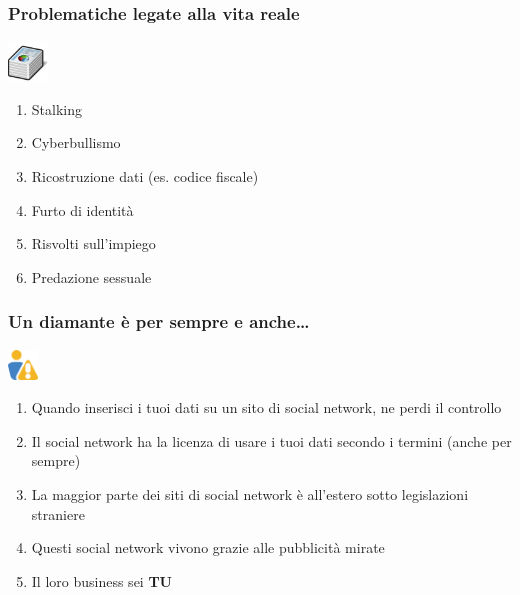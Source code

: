 \documentclass[xcolor=svgnames,handout]{beamer}
\begin{document}
\begin{frame}
	\frametitle{Problematiche legate alla vita reale}

	\begin{block}{\includegraphics[width=40px]{img/data.png}}
			\begin{enumerate}
					\item Stalking
						\pause
					\item Cyberbullismo
						\pause
					\item Ricostruzione dati (es. codice fiscale)
						\pause
					\item Furto di identità
						\pause
					\item Risvolti sull'impiego
						\pause
					\item Predazione sessuale
			\end{enumerate}
	\end{block}
\end{frame}

\begin{frame}
	\frametitle{Un diamante è per sempre e anche\ldots}

	\begin{block}{\includegraphics[width=30px]{img/warning.png}}
			\begin{enumerate}
					\item Quando inserisci i tuoi dati su un sito di social network, ne perdi il controllo
						\pause
					\item Il social network ha la licenza di usare i tuoi dati secondo i termini (anche per sempre)
						\pause
					\item La maggior parte dei siti di social network è all'estero sotto legislazioni straniere
						\pause
					\item Questi social network vivono grazie alle pubblicità mirate
						\pause
					\item Il loro business sei {\bf TU}
			\end{enumerate}
	\end{block}
\end{frame}
\end{document}
